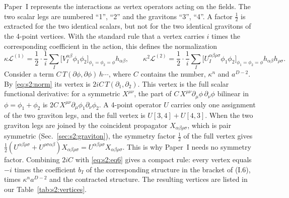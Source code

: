\documentclass[aps,prd,onecolumn,10pt,nofootinbib,floatfix]{revtex4-2}
\newcommand{\PI}{Paper~I}
\newcommand{\eqI}[1]{(I.#1)}
\begin{document}
\PI{} represents the interactions as vertex operators acting on the fields.
The two scalar legs are numbered ``1'', ``2'' and the gravitons ``3'',
``4''. A factor $\tfrac12$ is extracted for the two identical scalars, but
not for the two identical gravitons of the 4-point vertices. With the
standard rule that a vertex carries $i$ times the corresponding coefficient
in the action, this defines the normalization
\begin{equation}
\kappa\mathcal L^{(1)}=\frac12\cdot\frac1i\sum_I\Big[V_I^{\alpha\beta}\phi_1\phi_2\Big]_{\phi_1=\phi_2=\phi}h_{\alpha\beta},
\qquad
\kappa^2\mathcal L^{(2)}=\frac12\cdot\frac1i\sum_I\Big[U_I^{\alpha\beta\rho\sigma}\phi_1\phi_2\Big]_{\phi_1=\phi_2=\phi}h_{\alpha\beta}h_{\rho\sigma}.
\label{eq:s2:norm}
\end{equation}
Consider a term $C\,T(\partial\phi,\partial\phi)\,h\cdots$, where $C$ contains
the number, $\kappa^n$ and $a^{D-2}$. By \eqref{eq:s2:norm} its vertex is
$2iC\,T(\partial_1,\partial_2)$. This vertex is the full scalar functional
derivative: for a symmetric $X^{\mu\nu}$, the part of
$C\,X^{\mu\nu}\partial_\mu\phi\,\partial_\nu\phi$ bilinear in
$\phi=\phi_1+\phi_2$ is $2C\,X^{\mu\nu}\partial_\mu\phi_1\partial_\nu\phi_2$.
A 4-point operator $U$ carries only one assignment of the two graviton legs,
and the full vertex is $U[3,4]+U[4,3]$. When the two graviton legs are
joined by the coincident propagator $X_{\alpha\beta\rho\sigma}$, which is
pair symmetric (Sec.~\ref{sec:s2:graviton}), the symmetry factor $\tfrac12$
of the full vertex gives
$\tfrac12(U^{\alpha\beta\rho\sigma}+U^{\rho\sigma\alpha\beta})X_{\alpha\beta\rho\sigma}=U^{\alpha\beta\rho\sigma}X_{\alpha\beta\rho\sigma}$.
This is why \PI{} needs no symmetry factor. Combining $2iC$ with
\eqref{eq:s2:eq6} gives a compact rule: every vertex equals $-i$ times the
coefficient $b_I$ of the corresponding structure in the bracket of \eqI{6},
times $\kappa^na^{D-2}$ and the contracted structure. The resulting vertices
are listed in our Table~\ref{tab:s2:vertices}.
\end{document}

